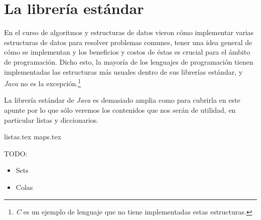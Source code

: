 \section{La librería estándar}
  En el curso de algoritmos y estructuras de datos vieron cómo implementar varias estructuras de 
  datos para resolver problemas comunes, tener una idea general de cómo se implementan y los 
  beneficios y costos de éstas es crucial para el ámbito de programación.
  Dicho esto, la mayoría de los lenguajes de programación tienen implementadas las estructuras más
  usuales dentro de sus librerías estándar, y \textit{Java} no es la excepción.\footnote{\textit{C} 
  es un ejemplo de lenguaje que no tiene implementadas estas estructuras.}

  La librería estándar de \textit{Java} es demasiado amplia como para cubrirla en este apunte por lo
  que sólo veremos los contenidos que nos serán de utilidad, en particular listas y diccionarios.
  
  {listas.tex}
  {maps.tex}

  TODO:
  \begin{itemize}
    \item Sets
    \item Colas
  \end{itemize}